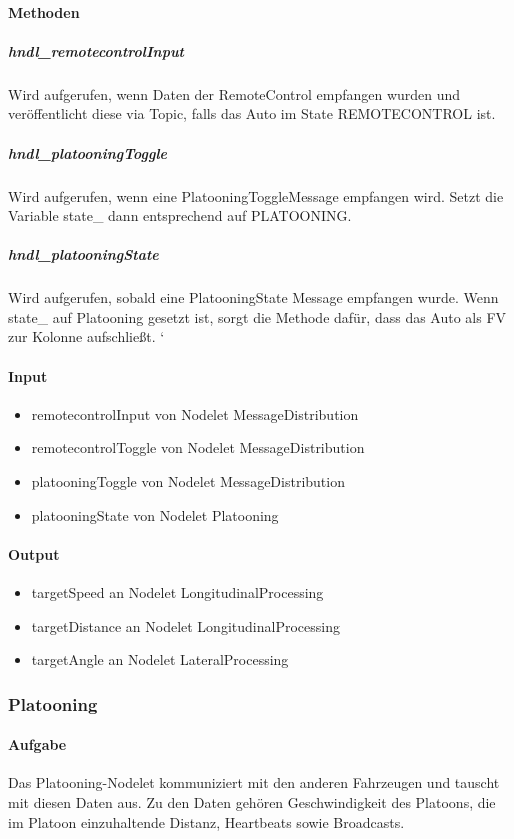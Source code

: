 \documentclass[a4paper, 12pt, titlepage]{scrartcl}
\begin{document}
				\paragraph{Methoden}
					\subparagraph{hndl\_remotecontrolInput} Wird aufgerufen, wenn Daten der RemoteControl empfangen wurden und veröffentlicht diese via Topic, falls das Auto im State REMOTECONTROL ist.
					\subparagraph{hndl\_platooningToggle} Wird aufgerufen, wenn eine PlatooningToggleMessage empfangen wird. Setzt die Variable state\_ dann entsprechend auf PLATOONING. 
					\subparagraph{hndl\_platooningState} Wird aufgerufen, sobald eine PlatooningState Message empfangen wurde. Wenn state\_ auf Platooning gesetzt ist, sorgt die Methode dafür, dass das Auto als FV zur Kolonne aufschließt. ‘
				\paragraph{Input}
				    \begin{itemize}
				        \item remotecontrolInput von Nodelet MessageDistribution
				        \item remotecontrolToggle von Nodelet MessageDistribution 
				        \item platooningToggle von Nodelet MessageDistribution 
				        \item platooningState von Nodelet Platooning
				    \end{itemize}
				\paragraph{Output}
				    \begin{itemize}
				        \item targetSpeed an Nodelet LongitudinalProcessing
				        \item targetDistance an Nodelet LongitudinalProcessing
				        \item targetAngle an Nodelet LateralProcessing
				    \end{itemize}
				
			\subsubsection{Platooning}
			\label{platooning}
				\paragraph{Aufgabe} Das Platooning-Nodelet kommuniziert mit den anderen Fahrzeugen und tauscht mit diesen Daten aus. Zu den Daten gehören Geschwindigkeit des Platoons, die im Platoon einzuhaltende Distanz, Heartbeats sowie Broadcasts. 
\end{document}
